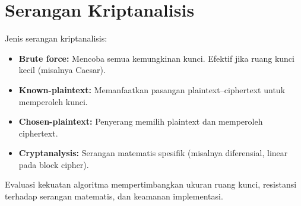 \section{Serangan Kriptanalisis}

Jenis serangan kriptanalisis:
\begin{itemize}
\item \textbf{Brute force:} Mencoba semua kemungkinan kunci. Efektif jika ruang kunci kecil (misalnya Caesar).
\item \textbf{Known-plaintext:} Memanfaatkan pasangan plaintext--ciphertext untuk memperoleh kunci.
\item \textbf{Chosen-plaintext:} Penyerang memilih plaintext dan memperoleh ciphertext.
\item \textbf{Cryptanalysis:} Serangan matematis spesifik (misalnya diferensial, linear pada block cipher).
\end{itemize}

Evaluasi kekuatan algoritma mempertimbangkan ukuran ruang kunci, resistansi terhadap serangan matematis, dan keamanan implementasi.
